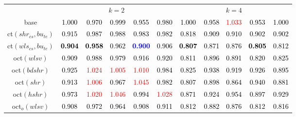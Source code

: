 \begin{tabular}[t]{c|>{}cccc>{}c|ccccc}
\multicolumn{1}{c}{} & \multicolumn{5}{c}{\textbf{$k = 2$}} & \multicolumn{5}{c}{\textbf{$k = 4$}}\\
base & \textcolor{black}{1.000} & \textcolor{black}{0.970} & \textcolor{black}{0.999} & \textcolor{black}{0.955} & \textcolor{black}{0.980} & \textcolor{black}{1.000} & \textcolor{black}{0.958} & \textcolor{red}{1.033} & \textcolor{black}{0.953} & \textcolor{black}{1.000}\\
ct$(shr_{cs}, bu_{te})$ & \textcolor{black}{0.915} & \textcolor{black}{0.987} & \textcolor{black}{0.988} & \textcolor{black}{0.983} & \textcolor{black}{0.982} & \textcolor{black}{0.818} & \textcolor{black}{0.909} & \textcolor{black}{0.910} & \textcolor{black}{0.902} & \textcolor{black}{0.902}\\
ct$(wls_{cs}, bu_{te})$ & \textcolor{black}{\textbf{0.904}} & \textcolor{black}{\textbf{0.958}} & \textcolor{black}{0.962} & \textcolor{blue}{\textbf{0.900}} & \textcolor{black}{0.906} & \textcolor{black}{\textbf{0.807}} & \textcolor{black}{0.871} & \textcolor{black}{0.876} & \textcolor{black}{\textbf{0.805}} & \textcolor{black}{0.812}\\
oct$(wlsv)$ & \textcolor{black}{0.909} & \textcolor{black}{0.988} & \textcolor{black}{0.979} & \textcolor{black}{0.916} & \textcolor{black}{0.920} & \textcolor{black}{0.811} & \textcolor{black}{0.896} & \textcolor{black}{0.891} & \textcolor{black}{0.820} & \textcolor{black}{0.825}\\
oct$(bdshr)$ & \textcolor{black}{0.925} & \textcolor{red}{1.024} & \textcolor{red}{1.005} & \textcolor{red}{1.010} & \textcolor{black}{0.984} & \textcolor{black}{0.825} & \textcolor{black}{0.938} & \textcolor{black}{0.919} & \textcolor{black}{0.926} & \textcolor{black}{0.895}\\
oct$(shr)$ & \textcolor{black}{0.913} & \textcolor{red}{1.006} & \textcolor{black}{0.967} & \textcolor{red}{1.045} & \textcolor{black}{0.982} & \textcolor{black}{0.807} & \textcolor{black}{0.898} & \textcolor{black}{0.864} & \textcolor{black}{0.940} & \textcolor{black}{0.881}\\
oct$(hshr)$ & \textcolor{black}{0.973} & \textcolor{red}{1.020} & \textcolor{red}{1.046} & \textcolor{black}{0.994} & \textcolor{red}{1.028} & \textcolor{black}{0.871} & \textcolor{black}{0.924} & \textcolor{black}{0.954} & \textcolor{black}{0.897} & \textcolor{black}{0.929}\\
oct$_o(wlsv)$ & \textcolor{black}{0.908} & \textcolor{black}{0.972} & \textcolor{black}{0.964} & \textcolor{black}{0.908} & \textcolor{black}{0.911} & \textcolor{black}{0.812} & \textcolor{black}{0.882} & \textcolor{black}{0.876} & \textcolor{black}{0.812} & \textcolor{black}{0.816}\\

\end{tabular}
